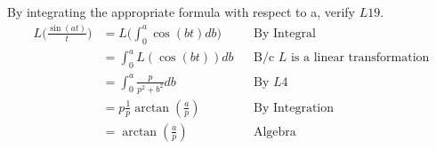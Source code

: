 \item [5.] By integrating the appropriate formula with respect to a, verify $L19$.
\begin{align*}
    L\Big(\frac{\sin(at)}{t}\Big) &= L \Big(\int_0^a \cos(bt)db\Big) && \text{By Integral} \\\
    &= \int_0^a L(\cos(bt))db && \text{B/c $L$ is a linear transformation}\\
    &=\int_0^a \frac{p}{p^2+b^2}db &&\text{By } L4\\
    &=p\frac{1}{p}\arctan(\frac{a}{p}) &&\text{By Integration}\\
    &=\arctan(\frac{a}{p}) &&\text{Algebra}\\
\end{align*}